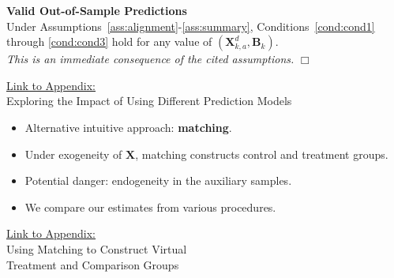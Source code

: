 \documentclass[static]{JJH-Beamer}
\begin{document}
\begin{frame}

\setcounter{theorem}{0}
\begin{theorem}\label{theorem:main} \textbf{Valid Out-of-Sample Predictions} \\
Under Assumptions~\ref{ass:alignment}-\ref{ass:summary}, Conditions~\ref{cond:cond1} through \ref{cond:cond3} hold for any value of $\left( \bm{X}^d_{k,a}, \bm{B}_k \right)$. \\
\emph{This is an immediate consequence of the cited assumptions.} $\Box$
\end{theorem}

\end{frame}

\begin{frame}

\hypertarget{ret:candycane}{}
\begin{center}
\hyperlink{candycane}{\underline{Link to Appendix:}}\\
Exploring the Impact of Using Different Prediction Models
\end{center}

\end{frame}

\begin{frame}

\begin{itemize}
\item Alternative intuitive approach: \textbf{matching}.
\item Under exogeneity of $\bm{X}$, matching constructs control and treatment groups.
\item Potential danger: endogeneity in the auxiliary samples.
\item We compare our estimates from various procedures.
\end{itemize}

\hypertarget{ret:potpie}{}
\begin{center}
\hyperlink{potpie}{\underline{Link to Appendix:}}\\
Using Matching to Construct Virtual \\ Treatment and Comparison Groups
\end{center}

\end{frame}
\end{document}
